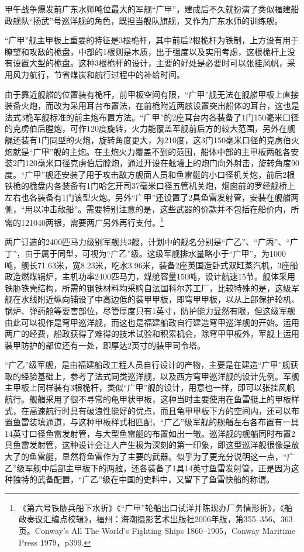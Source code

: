 \documentclass[12pt,UTF8]{ctexbook}
\begin{document}
甲午战争爆发前广东水师吨位最大的军舰“广甲”，建成后不久就扮演了类似福建船政舰队“扬武”号巡洋舰的角色，既担当舰队旗舰，又作为广东水师的训练舰。

“广甲”舰主甲板上重要的特征是3根桅杆，其中前后2根桅杆为铁制，上方设有用于瞭望和攻敌的桅盘，中部的1根则是木质，出于强度以及实用考虑，这根桅杆上没有设置大型的桅盘。这种3根桅杆的设计，主要的好处是必要时可以张挂风帆，采用风力航行，节省煤炭和航行过程中的补给时间。

由于靠近舰艏的位置装有桅杆，前甲板空间有限，“广甲”舰无法在舰艏甲板上直接装备火炮，而改为采用耳台布置法，在前桅附近两舷设置突出船体的耳台，这也是法式3桅军舰标准的前主炮布置方法。“广甲”的2座耳台内各装备了1门150毫米口径的克虏伯后膛炮，可作120度旋转，火力能覆盖军舰前后方的较大范围，另外在舰艉还装有1门同型的火炮，旋转角度更大，为210度，这3门150毫米口径的克虏伯火炮就是“广甲”舰的主炮。在主炮火力覆盖不到的范围，船体中部的主甲板两舷各安装2门120毫米口径克虏伯后膛炮，通过开设在舷墙上的炮门向外射击，旋转角度90度。“广甲”舰还安装了用于攻击敌方舰面人员和鱼雷艇的小口径机关炮，前后2根铁桅的桅盘内各装备有1门哈乞开司37毫米口径五管机关炮，烟囱前的罗经舰桥上左右也各装备有1门该型火炮。另外“广甲”还设置了2具鱼雷发射管，安装在舰艏两侧，“用以冲击敌船”。需要特别注意的是，这些武器的价款并不包括在船价内，所需的121040两银，需要两广另外再行支付。\footnote{《第六号铁胁兵船下水折》《“广甲”轮船出口试洋并陈现办厂务情形折》，《船政奏议汇编点校辑》，福州：海潮摄影艺术出版社2006年版，第355--356、363页。Conway's All The World's Fighting Ships 1860--1905，Conway Maritime Press 1979，p399.}

两广订造的2400匹马力级别军舰共3艘，计划中的舰名分别是“广乙”、“广丙”、“广丁”，由于属于同型，可视为“广乙”级。这级军舰排水量略小于“广甲”，为1000吨，舰长71.63米，宽8.23米，吃水3.96米，装备2座英国造卧式双缸蒸汽机，3座船政造燃煤锅炉，主机功率2400匹马力，煤舱容量150吨，设计航速15节。舰体采用铁胁铁壳结构，所需的钢铁材料均采购自法国科尔苏工厂，比较特殊的是，这级军舰在水线附近纵向铺设了中高边低的装甲甲板，即穹甲甲板，以从上部保护轮机、锅炉、弹药舱等要害部位，尽管厚度只有1英寸，防护能力显然有限，但这级军舰由此可以视作是穹甲巡洋舰，而这也是福建船政自行建造穹甲巡洋舰的开始。运用两广的经费，船政获得了难得的技术试验和积累机会，除穹甲甲板外，军舰上运用装甲防护的部位还有一处，即厚达2英寸的装甲司令塔。

“广乙”级军舰，是由福建船政工程人员自行设计的产物，主要是在建造“广甲”舰获取的经验基础上，参考了法式同类巡洋舰，以及西方穹甲巡洋舰的设计先例。军舰主甲板上同样装有3根桅杆，类似“广甲”舰的设计，用意也一样，即可以张挂风帆航行。舰艏采用了很不寻常的龟甲状甲板，这种当时主要使用在鱼雷艇上的甲板样式，在高速航行时具有破浪性能好的优点，而且龟甲甲板下方的空间内，还可以布置鱼雷装填通道，与这种甲板样式相匹配，“广乙”级军舰的舰艏左右各布置有一具14英寸口径鱼雷发射管，与大型鱼雷艇的布置如出一辙。巡洋舰的舰艏同时布置2具鱼雷发射管，这种设计会让人产生极为深刻的第一印象，即这型巡洋舰很像是放大了的鱼雷艇，显然将鱼雷作为了主要的武器。似乎为了更充分说明这一点，“广乙”级军舰中后部主甲板下的两舷，还各装备了1具14英寸鱼雷发射管，正是因为这种独特的武备配置，“广乙”级在中国的史料中，又留下了鱼雷快船的称谓。
\end{document}
